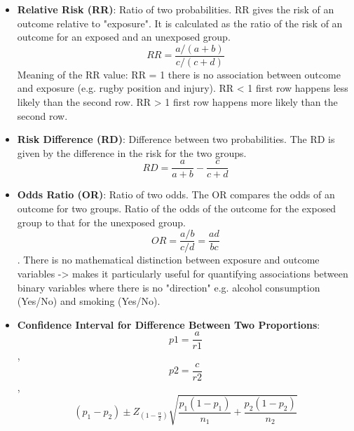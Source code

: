 \documentclass[12pt]{book}
\begin{document}
\newpage

\pagestyle{fancy}

\begin{itemize}
\item \textbf{Relative Risk (RR)}: Ratio of two probabilities. RR gives the risk of an outcome relative to "exposure". It is calculated as the ratio of the risk of an outcome for an exposed and an unexposed group. $$RR = \frac{a/(a+b)}{c/(c+d)}$$
Meaning of the RR value: RR = 1 there is no association between outcome and exposure (e.g. rugby position and injury). RR < 1 first row happens less likely than the second row. RR > 1 first row happens more likely than the second row.
\item \textbf{Risk Difference (RD)}: Difference between two probabilities. The RD is given by the difference in the risk for the two groups. $$RD = \frac{a}{a + b} - \frac{c}{c + d}$$
\item \textbf{Odds Ratio (OR)}: Ratio of two odds. The OR compares the odds of an outcome for two groups. Ratio of the odds of the outcome for the exposed group to that for the unexposed group. $$OR = \frac{a/b}{c/d} = \frac{ad}{bc}$$. There is no mathematical distinction between exposure and outcome variables -> makes it particularly useful for quantifying associations between binary variables where there is no "direction" e.g. alcohol consumption (Yes/No) and smoking (Yes/No).
\item \textbf{Confidence Interval for Difference Between Two Proportions}: $$p1 = \frac{a}{r1}$$, $$p2 = \frac{c}{r2}$$, $$(p_1 - p_2) \pm Z_{(1 - \frac{\alpha}{2})} \sqrt{\frac{p_1(1-p_1)}{n_1} + \frac{p_2(1-p_2)}{n_2}}$$


\end{itemize}
\end{document}
